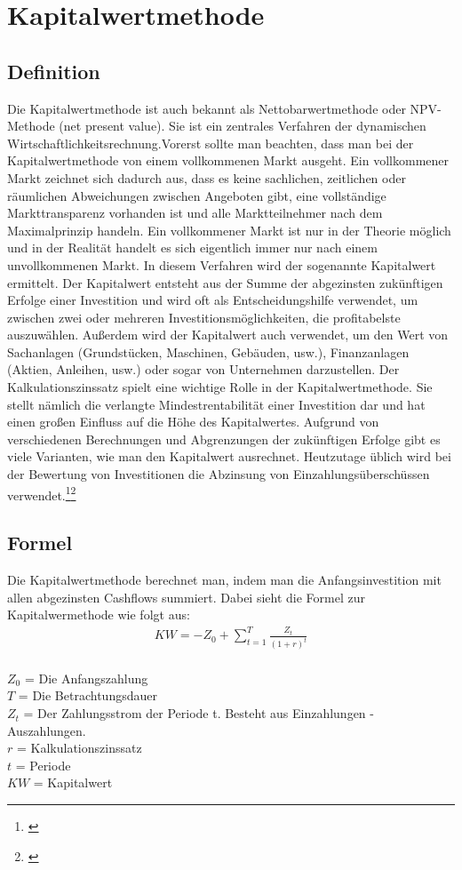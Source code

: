 \chapter{Kapitalwertmethode}
\label{Kapitalwertmethode}

\section{Definition}
Die Kapitalwertmethode ist auch bekannt als Nettobarwertmethode oder NPV-Methode (net present value).
Sie ist ein zentrales Verfahren der dynamischen Wirtschaftlichkeitsrechnung.Vorerst sollte man beachten, dass man bei der Kapitalwertmethode von einem vollkommenen Markt ausgeht. Ein vollkommener Markt zeichnet sich dadurch aus, dass es keine sachlichen, zeitlichen oder räumlichen Abweichungen zwischen Angeboten gibt, eine vollständige Markttransparenz vorhanden ist und alle Marktteilnehmer nach dem Maximalprinzip handeln. Ein vollkommener Markt ist nur in der Theorie möglich und in der Realität handelt es sich eigentlich immer nur nach einem unvollkommenen Markt. In diesem Verfahren wird der sogenannte Kapitalwert ermittelt. Der Kapitalwert entsteht aus der Summe der abgezinsten zukünftigen Erfolge einer Investition und wird oft als Entscheidungshilfe verwendet, um zwischen zwei oder mehreren Investitionsmöglichkeiten, die profitabelste auszuwählen. Außerdem wird der Kapitalwert auch verwendet, um den Wert von Sachanlagen (Grundstücken, Maschinen, Gebäuden, usw.), Finanzanlagen (Aktien, Anleihen, usw.) oder sogar von Unternehmen darzustellen.
Der Kalkulationszinssatz spielt eine wichtige Rolle in der Kapitalwertmethode. Sie stellt nämlich die verlangte Mindestrentabilität einer Investition dar und hat einen großen Einfluss auf die Höhe des Kapitalwertes.
Aufgrund von verschiedenen Berechnungen und Abgrenzungen der zukünftigen Erfolge gibt es viele Varianten, wie man den Kapitalwert ausrechnet. Heutzutage üblich wird bei der Bewertung von Investitionen die Abzinsung von Einzahlungsüberschüssen verwendet.\footnote{\cite{wikipedia-kapitalwertmethode}}\footnote{\cite{weltsparen-kapitalwertmethode}}
\newpage
\section{Formel}
Die Kapitalwertmethode berechnet man, indem man die Anfangsinvestition mit allen abgezinsten Cashflows summiert. Dabei sieht die Formel zur Kapitalwermethode wie folgt aus:
\begin{align*}
    KW = -Z_{0} + \sum \limits_{t=1}^{T}{\frac{Z_{t}}{(1+r)^{t}}}
\end{align*}
\\
$Z_0$ = Die Anfangszahlung \\
$T$  = Die Betrachtungsdauer\\
$Z_t$ = Der Zahlungsstrom der Periode t. Besteht aus Einzahlungen - Auszahlungen.\\
$r$ = Kalkulationszinssatz\\
$t$ = Periode\\
$KW$ = Kapitalwert
